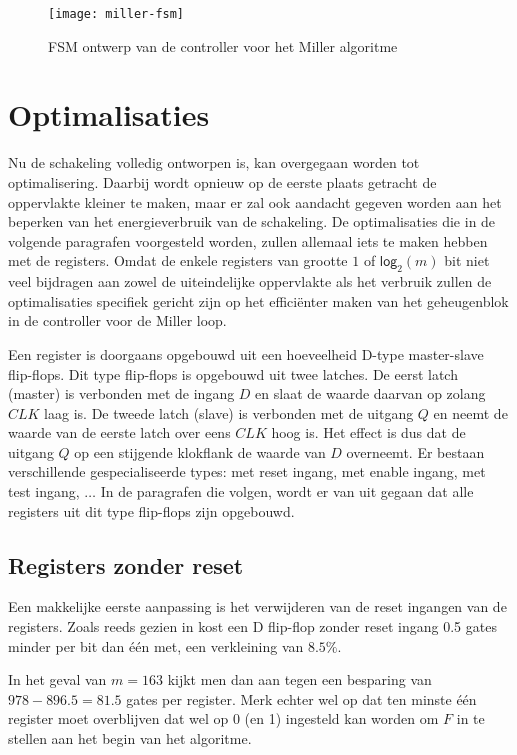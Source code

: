 \begin{figure}[h]
	\centering
		\texttt{[image: miller-fsm]}
		\caption{FSM ontwerp van de controller voor het Miller algoritme\label{figuur-miller-fsm}}
\end{figure}

\section{Optimalisaties\label{sectie-implementatie-optimalisaties}}

Nu de schakeling volledig ontworpen is, kan overgegaan worden tot optimalisering. Daarbij wordt opnieuw op de eerste plaats getracht de oppervlakte kleiner te maken, maar er zal ook aandacht gegeven worden aan het beperken van het energieverbruik van de schakeling. De optimalisaties die in de volgende paragrafen voorgesteld worden, zullen allemaal iets te maken hebben met de registers. Omdat de enkele registers van grootte $1$ of $\textsf{log}_2(m)$ bit niet veel bijdragen aan zowel de uiteindelijke oppervlakte als het verbruik zullen de optimalisaties specifiek gericht zijn op het effici\"enter maken van het geheugenblok in de controller voor de Miller loop.

Een register is doorgaans opgebouwd uit een hoeveelheid D-type master-slave flip-flops. Dit type flip-flops is opgebouwd uit twee latches. De eerst latch (master) is verbonden met de ingang $D$ en slaat de waarde daarvan op zolang $CLK$ laag is. De tweede latch (slave) is verbonden met de uitgang $Q$  en neemt de waarde van de eerste latch over eens $CLK$ hoog is. Het effect is dus dat de uitgang $Q$ op een stijgende klokflank de waarde van $D$ overneemt. Er bestaan verschillende gespecialiseerde types: met reset ingang, met enable ingang, met test ingang, $\ldots$ In de paragrafen die volgen, wordt er van uit gegaan dat alle registers uit dit type flip-flops zijn opgebouwd.

\subsection{Registers zonder reset}

Een makkelijke eerste aanpassing is het verwijderen van de reset ingangen van de registers. Zoals reeds gezien in  kost een D flip-flop zonder reset ingang 0.5 gates minder per bit dan \'e\'en met, een verkleining van $8.5\%$.

In het geval van $m = 163$ kijkt men dan aan tegen een besparing van $978 - 896.5 = 81.5$ gates per register. Merk echter wel op dat ten minste \'e\'en register moet overblijven dat wel op 0 (en 1) ingesteld kan worden om $F$ in te stellen aan het begin van het algoritme.

